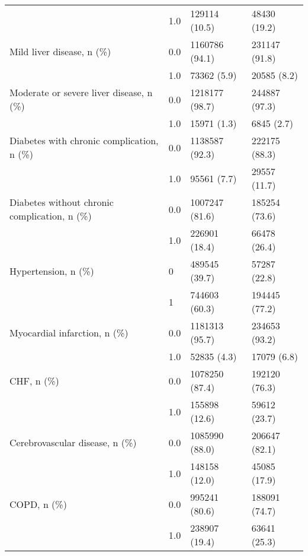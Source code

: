 \begin{tabular}{llll}
                                       & 1.0 &                         129114 (10.5) &       48430 (19.2) \\
Mild liver disease, n (\%) & 0.0 &                        1160786 (94.1) &      231147 (91.8) \\
                                       & 1.0 &                           73362 (5.9) &        20585 (8.2) \\
Moderate or severe liver disease, n (\%) & 0.0 &                        1218177 (98.7) &      244887 (97.3) \\
                                       & 1.0 &                           15971 (1.3) &         6845 (2.7) \\
Diabetes with chronic complication, n (\%) & 0.0 &                        1138587 (92.3) &      222175 (88.3) \\
                                       & 1.0 &                           95561 (7.7) &       29557 (11.7) \\
Diabetes without chronic complication, n (\%) & 0.0 &                        1007247 (81.6) &      185254 (73.6) \\
                                       & 1.0 &                         226901 (18.4) &       66478 (26.4) \\
Hypertension, n (\%) & 0 &                         489545 (39.7) &       57287 (22.8) \\
                                       & 1 &                         744603 (60.3) &      194445 (77.2) \\
Myocardial infarction, n (\%) & 0.0 &                        1181313 (95.7) &      234653 (93.2) \\
                                       & 1.0 &                           52835 (4.3) &        17079 (6.8) \\
CHF, n (\%) & 0.0 &                        1078250 (87.4) &      192120 (76.3) \\
                                       & 1.0 &                         155898 (12.6) &       59612 (23.7) \\
Cerebrovascular disease, n (\%) & 0.0 &                        1085990 (88.0) &      206647 (82.1) \\
                                       & 1.0 &                         148158 (12.0) &       45085 (17.9) \\
COPD, n (\%) & 0.0 &                         995241 (80.6) &      188091 (74.7) \\
                                       & 1.0 &                         238907 (19.4) &       63641 (25.3) \\

\end{tabular}

